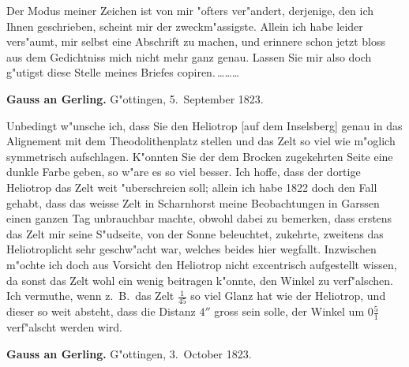 \documentclass[12pt,a4paper]{article}
\theoremstyle{plain}
\theoremstyle{definition}
\theoremstyle{remark}
\begin{document}
Der Modus meiner Zeichen ist von mir "ofters ver"andert, derjenige, den ich Ihnen geschrieben, scheint mir der zweckm"assigste. Allein ich habe leider vers"aumt, mir selbst eine Abschrift zu machen, und erinnere schon jetzt bloss aus dem Gedichtniss mich nicht mehr ganz genau. Lassen Sie mir also doch g"utigst diese Stelle meines Briefes copiren.\,\ldots\ldots\ldots

\medskip
\noindent \textbf{Gauss an Gerling.} G"ottingen, 5.~September 1823.

\medskip
\noindent Unbedingt w"unsche ich, dass Sie den Heliotrop [auf dem Inselsberg] genau in das Alignement mit dem Theodolithenplatz stellen und das Zelt so viel wie m"oglich symmetrisch aufschlagen. K"onnten Sie der dem Brocken zugekehrten Seite eine dunkle Farbe geben, so w"are es so viel besser. Ich hoffe, dass der dortige Heliotrop das Zelt weit "uberschreien soll; allein ich habe 1822 doch den Fall gehabt, dass das weisse Zelt in Scharnhorst meine Beobachtungen in Garssen einen ganzen Tag unbrauchbar machte, obwohl dabei zu bemerken, dass erstens das Zelt mir seine S"udseite, von der Sonne beleuchtet, zukehrte, zweitens das Heliotroplicht sehr geschw"acht war, welches beides hier wegfallt. Inzwischen m"ochte ich doch aus Vorsicht den Heliotrop nicht excentrisch aufgestellt wissen, da sonst das Zelt wohl ein wenig beitragen k"onnte, den Winkel zu verf"alschen. Ich vermuthe, wenn z.~B.\ das Zelt $\frac{1}{45}$ so viel Glanz hat wie der Heliotrop, und dieser so weit absteht, dass die Distanz $4''$ gross sein solle, der Winkel um $0\frac{5}{1}$ verf"alscht werden wird.

\medskip
\noindent \textbf{Gauss an Gerling.} G"ottingen, 3.~October 1823.
\end{document}
